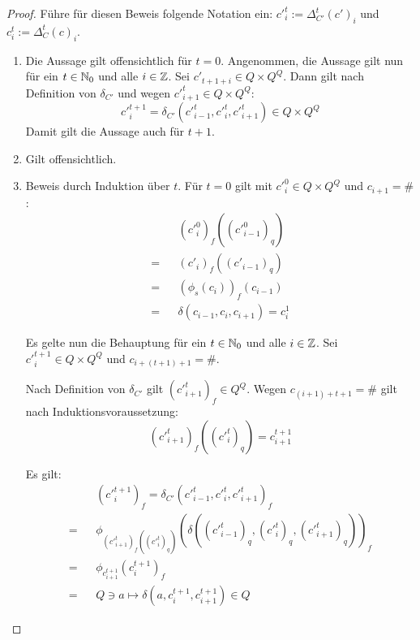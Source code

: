 \begin{proof}
    Führe für diesen Beweis folgende Notation ein: $c'^{t}_i := \Delta^{t}_{C'}(c')_i$ und $c^t_i := \Delta^{t}_{C}(c)_i$.

    \begin{enumerate}
        \item
            Die Aussage gilt offensichtlich für $t = 0$. Angenommen, die Aussage gilt nun für ein $t \in \mathbb{N}_0$ und alle $i \in \mathbb{Z}$.
            Sei $c'_{t+1+i} \in Q \times Q^Q$. Dann gilt nach Definition von $\delta_{C'}$ und wegen $c'^{t}_{i+1} \in Q \times Q^Q$:
            \[
                c'^{t+1}_i = \delta_{C'}(c'^{t}_{i-1}, c'^{t}_{i}, c'^{t}_{i+1}) \in Q \times Q^Q
            \]
            Damit gilt die Aussage auch für $t + 1$.
            
        \item Gilt offensichtlich.
        
        \item
            Beweis durch Induktion über $t$.
            Für $t = 0$ gilt mit $c'^0_i \in Q \times Q^Q$ und $c_{i+1} = \#$:
            \begin{align*}
                  && (c'^0_i)_f((c'^0_{i-1})_q) \\
                = && (c'_i)_f((c'_{i-1})_q) \\
                = && (\phi_s(c_i))_f(c_{i-1}) \\
                = && \delta(c_{i-1}, c_i, c_{i+1}) = c^{1}_i
            \end{align*}
            
            Es gelte nun die Behauptung für ein $t \in \mathbb{N}_0$ und alle $i \in \mathbb{Z}$.
            Sei $c'^{t+1}_i \in Q \times Q^Q$ und $c_{i+(t+1)+1} = \#$.
            
            Nach Definition von $\delta_{C'}$ gilt $(c'^{t}_{i+1})_f \in Q^Q$.
            Wegen $c_{(i+1)+t+1} = \#$ gilt nach Induktionsvoraussetzung:
            \[
                (c'^t_{i+1})_f((c'^t_{i})_q) = c^{t+1}_{i+1}
            \]
            
            Es gilt:
            \begin{align*}
                  && (c'^{t+1}_i)_f = \delta_{C'}(c'^{t}_{i-1}, c'^{t}_{i}, c'^{t}_{i+1})_f \\
                = && \phi_{(c'^{t}_{i+1})_f((c'^{t}_{i})_q)}(\delta((c'^{t}_{i-1})_q, (c'^{t}_{i})_q, (c'^{t}_{i+1})_q))_f \\
                = && \phi_{c^{t+1}_{i+1}}(c^{t+1}_{i})_f \\
                = && Q \ni a \mapsto \delta(a, c^{t+1}_{i}, c^{t+1}_{i+1}) \in Q
            \end{align*}
            

\end{enumerate}
\end{proof}

